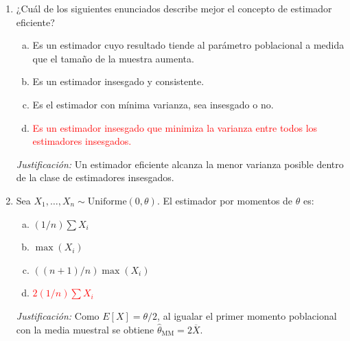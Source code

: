 \documentclass[a4paper]{article}
\begin{document}
\begin{enumerate}
\item ¿Cuál de los siguientes enunciados describe mejor el concepto de estimador eficiente?
\begin{enumerate}[a)]
    \item Es un estimador cuyo resultado tiende al parámetro poblacional a medida que el tamaño de la muestra aumenta.
    \item Es un estimador insesgado y consistente.
    \item Es el estimador con mínima varianza, sea insesgado o no.
    \item \textcolor{red}{Es un estimador insesgado que minimiza la varianza entre todos los estimadores insesgados.}
\end{enumerate}
\smallskip
\textit{Justificación:} Un estimador eficiente alcanza la menor varianza posible dentro de la clase de estimadores insesgados.

\item Sea $X_1, \dots, X_n \sim \text{Uniforme}(0, \theta)$. El estimador por momentos de $\theta$ es:
\begin{enumerate}[a)]
    \item $(1/n) \sum X_i$
    \item $\max(X_i)$
    \item $((n+1)/n) \max(X_i)$
    \item \textcolor{red}{$2 (1/n) \sum X_i$}
\end{enumerate}
\smallskip
\textit{Justificación:} Como $E[X]=\theta/2$, al igualar el primer momento poblacional con la media muestral se obtiene $\widehat{\theta}_{\mathrm{MM}}=2\overline{X}$.

\end{enumerate}

 
\end{document}
